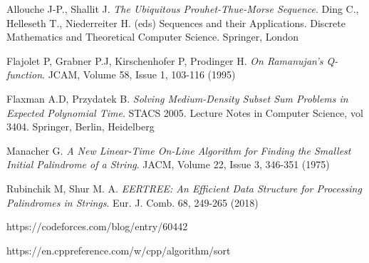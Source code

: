 \begin{thebibliography}{}
 Allouche J-P., Shallit J. \textit{The Ubiquitous Prouhet-Thue-Morse Sequence}. Ding C., Helleseth T., Niederreiter H. (eds) Sequences and their Applications. Discrete Mathematics and Theoretical Computer Science. Springer, London

\newpage

 Flajolet P, Grabner P.J, Kirschenhofer P, Prodinger H. \textit{On Ramanujan's Q-function}. JCAM, Volume 58, Issue 1, 103-116 (1995)

 Flaxman A.D, Przydatek B. \textit{Solving Medium-Density Subset Sum Problems
in Expected Polynomial Time}. STACS 2005. Lecture Notes in Computer Science, vol 3404. Springer, Berlin, Heidelberg

 Manacher G. \textit{A New Linear-Time On-Line Algorithm for Finding the Smallest Initial Palindrome of a String}. JACM, Volume 22, Issue 3, 346-351 (1975)

 Rubinchik M, Shur M. A. \textit{EERTREE: An Efficient Data Structure for Processing Palindromes in Strings}. Eur. J. Comb. 68, 249-265 (2018)

 https://codeforces.com/blog/entry/60442

 https://en.cppreference.com/w/cpp/algorithm/sort

\end{thebibliography}

